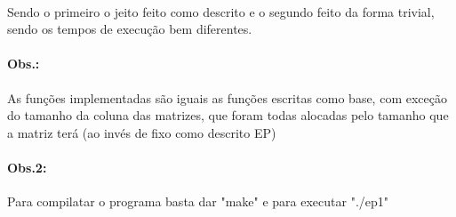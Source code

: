 \documentclass{article}
\begin{document}
	\begin{figure}[h]
		\qquad
	\end{figure}
	
	\paragraph{}
		Sendo o primeiro o jeito feito como descrito e o segundo feito da forma trivial, sendo os tempos de execução bem diferentes.
	\paragraph{Obs.:} As funções implementadas são iguais as funções escritas como base, com exceção do tamanho da coluna das matrizes, que foram todas alocadas pelo tamanho que a matriz terá (ao invés de fixo como descrito EP)
	\paragraph{Obs.2:} Para compilatar o programa basta dar "make" e para executar "./ep1"
		
\end{document}
